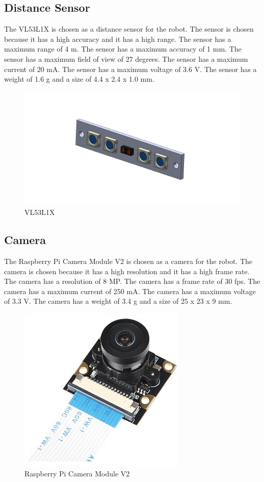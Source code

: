 \subsection{Distance Sensor}
The VL53L1X is chosen as a distance sensor for the robot. The sensor is chosen because it has a high accuracy and it has a high range. The sensor has a maximum range of 4 m. The sensor has a maximum accuracy of 1 mm. The sensor has a maximum field of view of 27 degrees. The sensor has a maximum current of 20 mA. The sensor has a maximum voltage of 3.6 V. The sensor has a weight of 1.6 g and a size of 4.4 x 2.4 x 1.0 mm.
\begin{figure}[h]
	\centering
	\includegraphics[width=0.5\linewidth]{VL53L1X}
	\caption[VL53L1X]{VL53L1X}
	\label{fig:VL53L1X}
	\end{figure}
\subsection{Camera}
The Raspberry Pi Camera Module V2 is chosen as a camera for the robot. The camera is chosen because it has a high resolution and it has a high frame rate. The camera has a resolution of 8 MP. The camera has a frame rate of 30 fps. The camera has a maximum current of 250 mA. The camera has a maximum voltage of 3.3 V. The camera has a weight of 3.4 g and a size of 25 x 23 x 9 mm.
\begin{figure}[h]
	\centering
	\includegraphics[width=0.5\linewidth]{Raspberry_Pi_Camera_Module_V2}
	\caption[Raspberry Pi Camera Module V2]{Raspberry Pi Camera Module V2}
	\label{fig:Raspberry_Pi_Camera_Module_V2}
\end{figure}
\newpage
